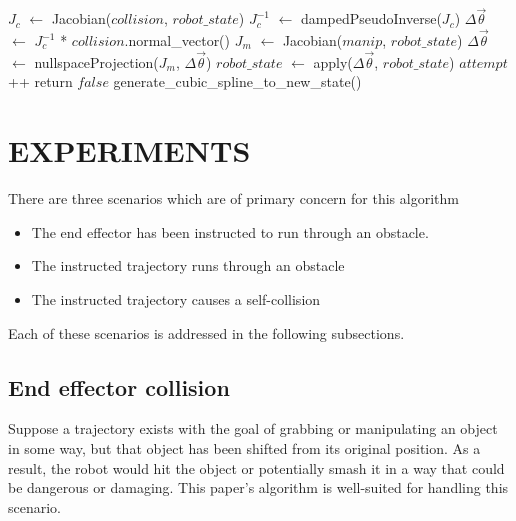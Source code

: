 \documentclass[letterpaper, 10 pt, conference]{ieeeconf}  %
\begin{document}
\begin{algorithm}

    \SetLine
     {
         {
            $J_{c}$ $\leftarrow$ Jacobian($collision$, $robot\_state$)\;
            $J_{c}^{-1}$ $\leftarrow$ dampedPseudoInverse($J_{c}$)\;
            $\Delta \vec{\theta}$ $\leftarrow$ $J_{c}^{-1}$ * $collision$.normal\_vector()\;
             {
                 {
                    $J_{m}$ $\leftarrow$ Jacobian($manip$, $robot\_state$)\;
                    $\Delta \vec{\theta}$ $\leftarrow$ nullspaceProjection($J_{m}$, $\Delta \vec{\theta}$)\;
                }
            }
            $robot\_state$ $\leftarrow$ apply($\Delta \vec{\theta}$, $robot\_state$)\;
            $attempt$++\;
             {
                return $false$\;
            }
        }
    }
    generate\_cubic\_spline\_to\_new\_state()\;

\end{algorithm}

\section{EXPERIMENTS}

There are three scenarios which are of primary concern for this algorithm

\begin{itemize}
\item The end effector has been instructed to run through an obstacle.
\item The instructed trajectory runs through an obstacle
\item The instructed trajectory causes a self-collision
\end{itemize}

Each of these scenarios is addressed in the following subsections.

\subsection{End effector collision}

Suppose a trajectory exists with the goal of grabbing or manipulating an object in some way, but that object has been shifted from its original position. As a result, the robot would hit the object or potentially smash it in a way that could be dangerous or damaging. This paper's algorithm is well-suited for handling this scenario. 
\end{document}
